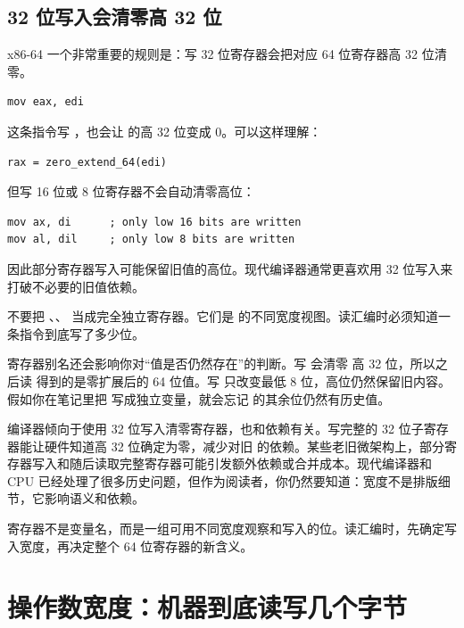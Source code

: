 \subsection{32 位写入会清零高 32 位}

x86-64 一个非常重要的规则是：写 32 位寄存器会把对应 64 位寄存器高 32 位清零。

\begin{lstlisting}
mov eax, edi
\end{lstlisting}

这条指令写 ，也会让  的高 32 位变成 0。可以这样理解：

\begin{lstlisting}
rax = zero_extend_64(edi)
\end{lstlisting}

但写 16 位或 8 位寄存器不会自动清零高位：

\begin{lstlisting}
mov ax, di      ; only low 16 bits are written
mov al, dil     ; only low 8 bits are written
\end{lstlisting}

因此部分寄存器写入可能保留旧值的高位。现代编译器通常更喜欢用 32 位写入来打破不必要的旧值依赖。

\begin{warningbox}
不要把 、、 当成完全独立寄存器。它们是  的不同宽度视图。读汇编时必须知道一条指令到底写了多少位。
\end{warningbox}

寄存器别名还会影响你对“值是否仍然存在”的判断。写  会清零  高 32 位，所以之后读  得到的是零扩展后的 64 位值。写  只改变最低 8 位，高位仍然保留旧内容。假如你在笔记里把  写成独立变量，就会忘记  的其余位仍然有历史值。

编译器倾向于使用 32 位写入清零寄存器，也和依赖有关。写完整的 32 位子寄存器能让硬件知道高 32 位确定为零，减少对旧  的依赖。某些老旧微架构上，部分寄存器写入和随后读取完整寄存器可能引发额外依赖或合并成本。现代编译器和 CPU 已经处理了很多历史问题，但作为阅读者，你仍然要知道：宽度不是排版细节，它影响语义和依赖。

\begin{mentalmodel}
寄存器不是变量名，而是一组可用不同宽度观察和写入的位。读汇编时，先确定写入宽度，再决定整个 64 位寄存器的新含义。
\end{mentalmodel}

\section{操作数宽度：机器到底读写几个字节}

